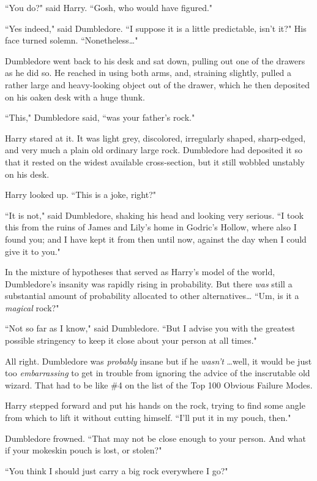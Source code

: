 ``You do?" said Harry. ``Gosh, who would have figured."

``Yes indeed," said Dumbledore. ``I suppose it is a little predictable, isn't it?" His face turned solemn. ``Nonetheless{\ldots}"

Dumbledore went back to his desk and sat down, pulling out one of the drawers as he did so. He reached in using both arms, and, straining slightly, pulled a rather large and heavy-looking object out of the drawer, which he then deposited on his oaken desk with a huge thunk.

``This," Dumbledore said, ``was your father's rock."

Harry stared at it. It was light grey, discolored, irregularly shaped, sharp-edged, and very much a plain old ordinary large rock. Dumbledore had deposited it so that it rested on the widest available cross-section, but it still wobbled unstably on his desk.

Harry looked up. ``This is a joke, right?"

``It is not," said Dumbledore, shaking his head and looking very serious. ``I took this from the ruins of James and Lily's home in Godric's Hollow, where also I found you; and I have kept it from then until now, against the day when I could give it to you."

In the mixture of hypotheses that served as Harry's model of the world, Dumbledore's insanity was rapidly rising in probability. But there \emph{was} still a substantial amount of probability allocated to other alternatives{\ldots} ``Um, is it a \emph{magical} rock?"

``Not so far as I know," said Dumbledore. ``But I advise you with the greatest possible stringency to keep it close about your person at all times."

All right. Dumbledore was \emph{probably} insane but if he \emph{wasn't} {\ldots}well, it would be just too \emph{embarrassing} to get in trouble from ignoring the advice of the inscrutable old wizard. That had to be like \#4 on the list of the Top 100 Obvious Failure Modes.

Harry stepped forward and put his hands on the rock, trying to find some angle from which to lift it without cutting himself. ``I'll put it in my pouch, then."

Dumbledore frowned. ``That may not be close enough to your person. And what if your mokeskin pouch is lost, or stolen?"

``You think I should just carry a big rock everywhere I go?"

